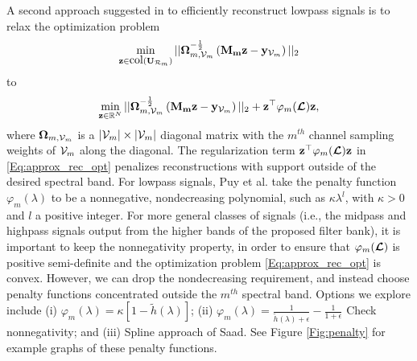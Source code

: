 \documentclass[journal, 10pt]{IEEEtran}
\begin{document}
A second approach suggested in \cite{PuyTGV15} to efficiently reconstruct lowpass signals is to relax the optimization problem
\begin{align*}
\min_{{\bf z} \in \hbox{col}({\bf U}_{{\cal R}_m})} ||{\boldsymbol \Omega}_{m,\V_m}^{-\frac{1}{2}}\left({\bf M_m z}-{{\bf y}_{\V_m}} \right) ||_2
\end{align*} 
to 
\begin{align}\label{Eq:approx_rec_opt}
\min_{{\bf z} \in \R^N} ||{\boldsymbol \Omega}_{m,\V_m}^{-\frac{1}{2}}\left({\bf M_m z}-{{\bf y}_{\V_m}} \right) ||_2+{\bf z}^{\top}\varphi_m(\L){\bf z},
\end{align} 
where ${\boldsymbol \Omega}_{m,{\mathcal{V}}_m}$ is a $|{\mathcal{V}}_m| \times |{\mathcal{V}}_m|$  diagonal matrix with the $m^{th}$ channel sampling weights of ${\mathcal{V}}_m$ along the diagonal. The regularization term ${\bf z}^{\top}\varphi_m(\boldsymbol{\mathcal{L}}){\bf z}$ in \eqref{Eq:approx_rec_opt} penalizes reconstructions with support outside of the desired spectral band. For lowpass signals, Puy et al. \cite{PuyTGV15} take the penalty function $\varphi_m(\lambda)$ to be a nonnegative, nondecreasing polynomial, such as $\kappa \lambda^l$, with $\kappa>0$ and $l$ a positive integer. For more general classes of signals (i.e., the midpass and highpass signals output from the higher bands of the proposed filter bank), it is important to keep the nonnegativity property, in order to ensure that $\varphi_m(\boldsymbol{\mathcal{L}})$ is positive semi-definite and the optimization problem \eqref{Eq:approx_rec_opt} is convex. However, we can drop the nondecreasing requirement, and instead choose penalty functions concentrated outside the $m^{th}$ spectral band. Options we explore include (i) $\varphi_m(\lambda)=\kappa\left[1-\tilde{h}(\lambda)\right]$; (ii) $\varphi_m(\lambda)=\frac{1}{\tilde{h}(\lambda)+\epsilon}-\frac{1}{1+\epsilon}$ {\color{red} Check nonnegativity}; and (iii) {\color{red} Spline approach of Saad. See Figure \ref{Fig:penalty} for example graphs of these penalty functions.}
\end{document}
